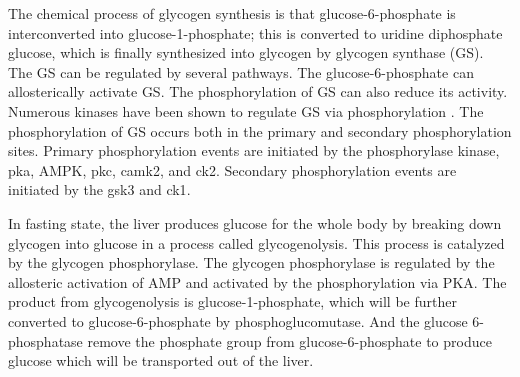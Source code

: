 The chemical process of glycogen synthesis is that glucose-6-phosphate is interconverted into glucose-1-phosphate; this is converted to uridine diphosphate glucose, which is finally synthesized into glycogen by glycogen synthase (GS).
The GS can be regulated by several pathways. The glucose-6-phosphate can allosterically activate GS. The phosphorylation of GS can also reduce its activity. Numerous kinases have been shown to regulate GS via phosphorylation \cite{palm_regulation_2013}. The phosphorylation of GS occurs both in the primary and secondary phosphorylation sites. Primary phosphorylation events are initiated by the phosphorylase kinase, \gls{pka}, \gls{AMPK}, \gls{pkc}, \gls{camk2}, and \gls{ck2}. Secondary phosphorylation events are initiated by the \gls{gsk3} and \gls{ck1}. 


In fasting state, the liver produces glucose for the whole body by breaking down glycogen into glucose in a process called glycogenolysis. This process is catalyzed by the glycogen phosphorylase. The glycogen phosphorylase is regulated by the allosteric activation of AMP and activated by the phosphorylation via PKA. The product from glycogenolysis is glucose-1-phosphate, which will be further converted to glucose-6-phosphate by phosphoglucomutase. And the glucose 6-phosphatase remove the phosphate group from glucose-6-phosphate to produce glucose which will be transported out of the liver. 


